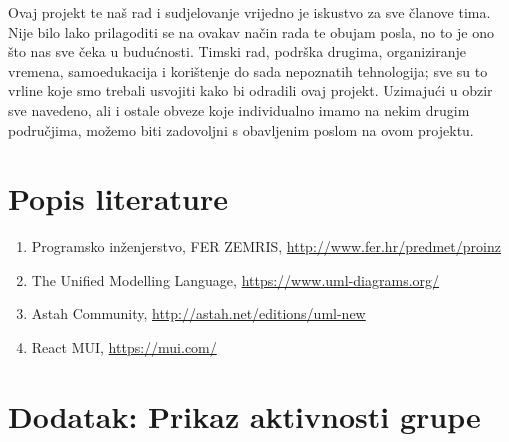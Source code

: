 \documentclass{article}
\begin{document}
	Ovaj projekt te naš rad i sudjelovanje vrijedno je iskustvo za sve članove tima. Nije bilo lako prilagoditi se na ovakav način rada te obujam posla, no to je ono što nas sve čeka u budućnosti. Timski rad, podrška drugima, organiziranje vremena, samoedukacija i korištenje do sada nepoznatih tehnologija; sve su to vrline koje smo trebali usvojiti kako bi odradili ovaj projekt. Uzimajući u obzir sve navedeno, ali i ostale obveze koje individualno imamo na nekim drugim područjima, možemo biti zadovoljni s obavljenim poslom na ovom projektu.\eject
	\eject
	
	\section{Popis literature}
	\begin{enumerate}
		\item Programsko inženjerstvo, FER ZEMRIS, \url{http://www.fer.hr/predmet/proinz}
		\item The Unified Modelling Language, \url{https://www.uml-diagrams.org/}
		\item Astah Community, \url{http://astah.net/editions/uml-new}
		\item React MUI, \url{https://mui.com/}
	\end{enumerate}
	\eject
	\section{Dodatak: Prikaz aktivnosti grupe}
\end{document}

